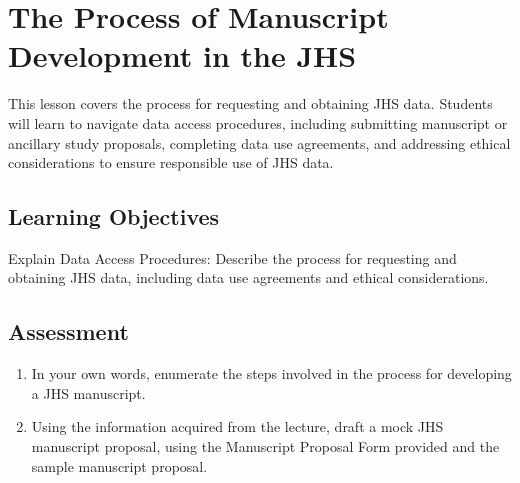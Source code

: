 \section{The Process of Manuscript Development in the JHS}
\label{sec:JHS-Manuscript}
This lesson covers the process for requesting and obtaining JHS data. Students will learn to navigate data access procedures, including submitting manuscript or ancillary study proposals, completing data use agreements, and addressing ethical considerations to ensure responsible use of JHS data.

\subsection{Learning Objectives}
Explain Data Access Procedures: Describe the process for requesting and obtaining JHS data, including data use agreements and ethical considerations.

\subsection{Assessment}
\begin{enumerate}
    \item In your own words, enumerate the steps involved in the process for developing a JHS manuscript.
    \item Using the information acquired from the lecture, draft a mock JHS manuscript proposal, using the Manuscript Proposal Form provided and the sample manuscript proposal.
\end{enumerate}


